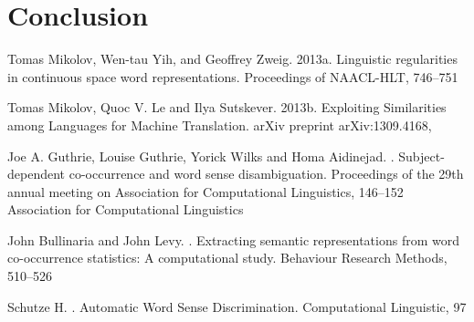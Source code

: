 \documentclass[11pt]{article}
\begin{document}
\section{Conclusion}
\begin{thebibliography}{}

Tomas Mikolov, Wen-tau Yih, and Geoffrey Zweig.
\newblock 2013a.
\newblock Linguistic regularities in continuous space word representations.
\newblock Proceedings of NAACL-HLT, 
746--751

Tomas Mikolov, Quoc V. Le and Ilya Sutskever.
\newblock 2013b.
\newblock Exploiting Similarities among Languages for Machine Translation.
\newblock arXiv preprint arXiv:1309.4168, 

Joe A. Guthrie, Louise Guthrie, Yorick Wilks and Homa Aidinejad.
.
\newblock Subject-dependent co-occurrence and word sense disambiguation.
\newblock Proceedings of the 29th annual meeting on Association for Computational Linguistics, 
146--152
\newblock
Association for Computational Linguistics

John Bullinaria and John Levy.
.
\newblock Extracting semantic representations from word co-occurrence statistics: A computational study.
\newblock Behaviour Research Methods, 
510--526

Schutze H.
.
\newblock Automatic Word Sense Discrimination.
\newblock Computational Linguistic, 
97
\end{thebibliography}
\end{document}
